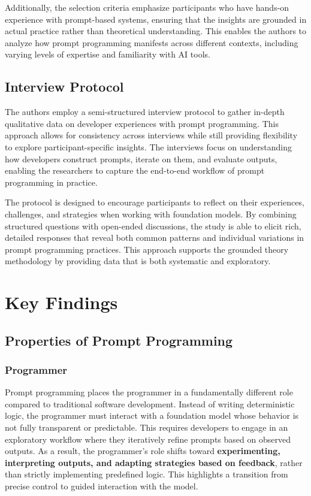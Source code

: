Additionally, the selection criteria emphasize participants who have hands-on experience with prompt-based systems, ensuring that the insights are grounded in actual practice rather than theoretical understanding. This enables the authors to analyze how prompt programming manifests across different contexts, including varying levels of expertise and familiarity with AI tools.

\subsection{Interview Protocol}
The authors employ a semi-structured interview protocol to gather in-depth qualitative data on developer experiences with prompt programming. This approach allows for consistency across interviews while still providing flexibility to explore participant-specific insights. The interviews focus on understanding how developers construct prompts, iterate on them, and evaluate outputs, enabling the researchers to capture the end-to-end workflow of prompt programming in practice.

The protocol is designed to encourage participants to reflect on their experiences, challenges, and strategies when working with foundation models. By combining structured questions with open-ended discussions, the study is able to elicit rich, detailed responses that reveal both common patterns and individual variations in prompt programming practices. This approach supports the grounded theory methodology by providing data that is both systematic and exploratory.

\section{Key Findings}
\subsection{Properties of Prompt Programming}
\subsubsection{Programmer}
Prompt programming places the programmer in a fundamentally different role compared to traditional software development. Instead of writing deterministic logic, the programmer must interact with a foundation model whose behavior is not fully transparent or predictable. This requires developers to engage in an exploratory workflow where they iteratively refine prompts based on observed outputs. As a result, the programmer’s role shifts toward \textbf{experimenting, interpreting outputs, and adapting strategies based on feedback}, rather than strictly implementing predefined logic. This highlights a transition from precise control to guided interaction with the model.

